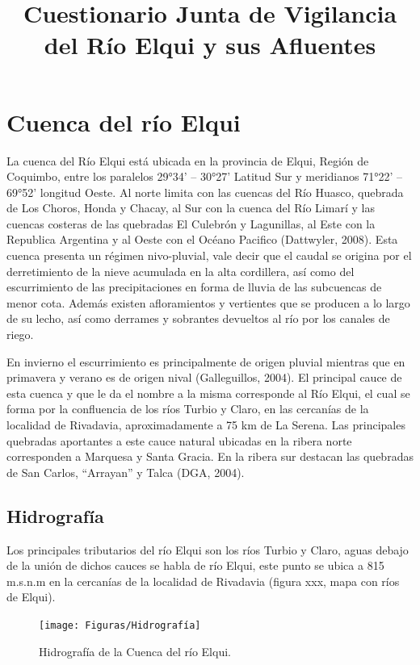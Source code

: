 \documentclass[10pt,]{article}
\title{Cuestionario Junta de Vigilancia del Río Elqui y sus Afluentes}
\date{ }                                           %
\begin{document}
\section{Cuenca del río Elqui}\bigskip

La cuenca del Río Elqui está ubicada en la provincia de Elqui, Región de Coquimbo, entre los paralelos 29°34’ – 30°27’ Latitud Sur y meridianos 71°22’ – 69°52’ longitud Oeste. Al norte limita con las cuencas del Río Huasco, quebrada de Los Choros, Honda y Chacay, al Sur con la cuenca del Río Limarí y las cuencas  costeras de las quebradas El Culebrón y Lagunillas, al Este con la Republica Argentina y al Oeste con el Océano Pacifico (Dattwyler, 2008).
Esta cuenca presenta un régimen nivo-pluvial, vale decir que el caudal se origina por el derretimiento de la nieve acumulada en la alta cordillera, así como del escurrimiento de las precipitaciones en forma de lluvia de las subcuencas de menor cota. Además existen afloramientos y vertientes que se producen a lo largo de su lecho, así como derrames y sobrantes devueltos al río por los canales de riego.\bigskip 

En invierno el escurrimiento es principalmente de origen pluvial  mientras que en primavera y verano es de origen nival (Galleguillos, 2004).
El principal cauce de esta cuenca y que le da el nombre a la misma corresponde al Río Elqui, el cual se forma por la confluencia de los ríos Turbio y Claro, en las cercanías de la localidad de Rivadavia, aproximadamente a 75 km de La Serena. Las principales quebradas aportantes a este cauce natural ubicadas en la ribera norte corresponden a Marquesa y Santa Gracia. En la ribera sur destacan las quebradas de San Carlos, “Arrayan” y Talca (DGA, 2004).

		\subsection{Hidrografía}\bigskip
		
		Los principales tributarios del río Elqui son los ríos Turbio y Claro, aguas debajo de la unión de dichos cauces se habla de río Elqui, este punto se ubica a 815 m.s.n.m en la cercanías de la localidad de 			 Rivadavia (figura xxx, mapa con ríos de Elqui).
		
\begin{figure}[H]
\begin{center}
\texttt{[image: Figuras/Hidrografía]}
\caption{Hidrografía de la Cuenca del río Elqui.}
\label{etiqueta_figura1}
\end{center}
\end{figure}
		
\end{document}
